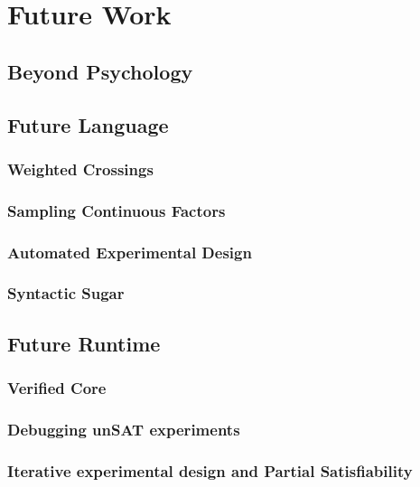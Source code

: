 \chapter{Future Work}
\section{Beyond Psychology}
\section{Future Language}
\subsection{Weighted Crossings}
\subsection{Sampling Continuous Factors}
\subsection{Automated Experimental Design}
\subsection{Syntactic Sugar}
\section{Future Runtime}
\subsection{Verified Core}
\subsection{Debugging unSAT experiments}
\subsection{Iterative experimental design and Partial Satisfiability}
